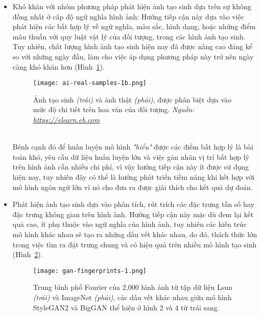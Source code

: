 \begin{itemize}
	\item Khó khăn với nhóm phương pháp phát hiện ảnh tạo sinh dựa trên sự không đồng nhất ở cấp độ ngữ nghĩa hình ảnh: Hướng tiếp cận này dựa vào việc phát hiện các bất hợp lý về ngữ nghĩa, màu sắc, hình dạng, hoặc những điểm mâu thuẫn với quy luật vật lý của đối tượng, trong các hình ảnh tạo sinh. Tuy nhiên, chất lượng hình ảnh tạo sinh hiện nay đã được nâng cao đáng kể so với những ngày đầu, làm cho việc áp dụng phương pháp này trở nên ngày càng khó khăn hơn (Hình~\ref{fig:ai-real-samples-1b}).
	\begin{figure}[htp]
		\centering
		\texttt{[image: ai-real-samples-1b.png]}
		\begin{minipage}{0.9\linewidth}
			\caption{Ảnh tạo sinh \textit{(trái)} và ảnh thật \textit{(phải)}, được phân biệt dựa vào mức độ chi tiết trên hoa văn của đối tượng. \textit{Nguồn: \url{https://elearn.eb.com}}}
			\label{fig:ai-real-samples-1b}
		\end{minipage}
	\end{figure}\\
	Bênh cạnh đó để huấn luyện mô hình \textit{"hiểu"} được các điểm bất hợp lý là bài toán khó, yêu cầu dữ liệu huấn luyện lớn và việc gán nhãn vị trí bất hợp lý trên hình ảnh cần nhiều chi phí, vì vậy hướng tiếp cận này ít được sử dụng hiện nay, tuy nhiên đây có thể là hướng phát triển tiềm năng khi kết hợp với mô hình ngôn ngữ lớn vì nó cho đưa ra được giải thích cho kết quả dự đoán.
	\item Phát hiện ảnh tạo sinh dựa vào phân tích, rút trích các đặc trưng tần số hay đặc trưng không gian trên hình ảnh. Hướng tiếp cận này mặc dù đem lại kết quả cao, ít phụ thuộc vào ngữ nghĩa của hình ảnh, tuy nhiên các kiến trúc mô hình khác nhau sẽ tạo ra những dấu vết khác nhau, do đó, thách thức lớn trong việc tìm ra đặt trưng chung và có hiệu quả trên nhiều mô hình tạo sinh (Hình~\ref{fig:gan-fingerprints-1}).
	
	\begin{figure}[h]
		\centering
		\texttt{[image: gan-fingerprints-1.png]}
	    \vspace{10pt} %
	    
		\begin{minipage}{\linewidth}
			\caption{Trung bình phổ Fourier của 2,000 hình ảnh từ tập dữ liệu Lsun \textit{(trái)} và ImageNet \textit{(phải)}, các dấu vết khác nhau giữa mô hình StyleGAN2 và BigGAN thể hiện ở hình 2 và 4 từ trái sang.}
			\label{fig:gan-fingerprints-1}
		\end{minipage}
	\end{figure}
\end{itemize}
